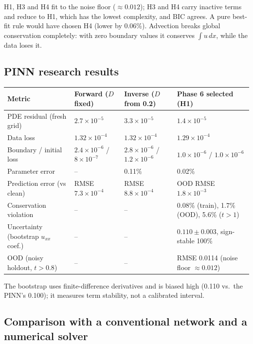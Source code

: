 \documentclass[11pt,a4paper]{article}
\begin{document}
H1, H3 and H4 fit to the noise floor ($\approx0.012$); H3 and H4 carry inactive terms and reduce to H1, which has the
lowest complexity, and BIC agrees. A pure best-fit rule would have chosen H4 (lower by 0.06\%). Advection breaks global
conservation completely: with zero boundary values it conserves $\int u\,dx$, while the data loses it.

\subsection{PINN research results}

\begin{center}
\footnotesize
\begin{tabular}{@{}L{3.6cm}L{3.3cm}L{3.3cm}L{5.0cm}@{}}
\toprule
\textbf{Metric} & \textbf{Forward ($D$ fixed)} & \textbf{Inverse ($D$ from 0.2)} & \textbf{Phase 6 selected (H1)} \\ \midrule
PDE residual (fresh grid) & $2.7\times10^{-5}$ & $3.3\times10^{-5}$ & $1.4\times10^{-5}$ \\
Data loss & $1.32\times10^{-4}$ & $1.32\times10^{-4}$ & $1.29\times10^{-4}$ \\
Boundary / initial loss & $2.4\times10^{-6}$ / $8\times10^{-7}$ & $2.8\times10^{-6}$ / $1.2\times10^{-6}$ & $1.0\times10^{-6}$ / $1.0\times10^{-6}$ \\
Parameter error & -- & 0.11\% & 0.02\% \\
Prediction error (vs clean) & RMSE $7.3\times10^{-4}$ & RMSE $8.8\times10^{-4}$ & OOD RMSE $1.8\times10^{-3}$ \\
Conservation violation & -- & -- & 0.08\% (train), 1.7\% (OOD), 5.6\% ($t>1$) \\
Uncertainty (bootstrap $u_{xx}$ coef.) & -- & -- & $0.110\pm0.003$, sign-stable 100\% \\
OOD (noisy holdout, $t>0.8$) & -- & -- & RMSE 0.0114 (noise floor $\approx0.012$) \\
\bottomrule
\end{tabular}
\end{center}
The bootstrap uses finite-difference derivatives and is biased high (0.110 vs.\ the PINN's 0.100); it measures term
stability, not a calibrated interval.

\subsection{Comparison with a conventional network and a numerical solver}
\end{document}
